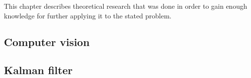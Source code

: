 \documentclass[../../main]{subfiles}
\begin{document}
This chapter describes theoretical research that was done in order to gain enough knowledge for further applying it to the stated problem.

\subsection{Computer vision}

\newpage

\subsection{Kalman filter}

\newpage
\end{document}
